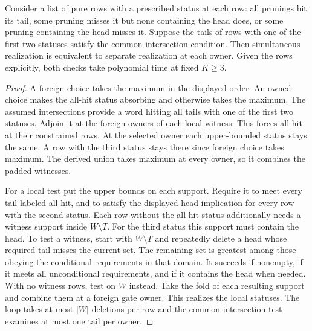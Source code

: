 \begin{corollary}
\label{core:cor:pruning-context-interpolation}
Consider a list of pure rows with a prescribed status at each row:
all prunings hit its tail, some pruning misses it but none containing
the head does, or some pruning containing the head misses it. Suppose
the tails of rows with one of the first two statuses satisfy the
common-intersection condition. Then simultaneous realization is
equivalent to separate realization at each owner. Given the rows
explicitly, both checks take polynomial time at fixed $K\ge3$.
\end{corollary}
\begin{proof}
A foreign choice takes the maximum in the displayed order. An owned
choice makes the all-hit status absorbing and otherwise takes the
maximum. The assumed intersections provide a word hitting all tails
with one of the first two statuses. Adjoin it at the foreign owners
of each local witness. This forces all-hit at their constrained
rows. At the selected owner each upper-bounded status stays the
same. A row with the third status stays there since foreign choice
takes maximum. The derived union takes maximum at every owner, so
it combines the padded witnesses.

For a local test put the upper bounds on each support. Require it
to meet every tail labeled all-hit, and to satisfy the displayed
head implication for every row with the second status. Each row
without the all-hit status additionally needs a witness support
inside $W\setminus T$. For the third status this support must contain
the head. To test a witness, start with $W\setminus T$ and repeatedly
delete a head whose required tail misses the current set. The
remaining set is greatest among those obeying the conditional
requirements in that domain. It succeeds if nonempty, if it meets
all unconditional requirements, and if it contains the head when
needed. With no witness rows, test on $W$ instead. Take the fold
of each resulting support and combine them at a foreign gate owner.
This realizes the local statuses. The loop takes at most $|W|$
deletions per row and the common-intersection test examines at most
one tail per owner.
\end{proof}
